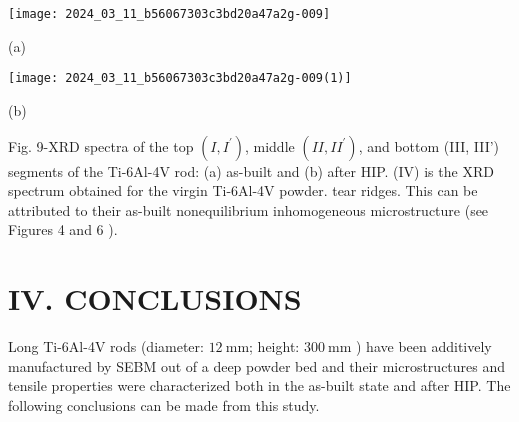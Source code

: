 \documentclass[10pt]{article}
\begin{document}
\begin{center}
\texttt{[image: 2024\_03\_11\_b56067303c3bd20a47a2g-009]}
\end{center}

(a)

\begin{center}
\texttt{[image: 2024\_03\_11\_b56067303c3bd20a47a2g-009(1)]}
\end{center}

(b)

Fig. 9-XRD spectra of the top $\left(I, I^{\prime}\right)$, middle $\left(I I, I I^{\prime}\right)$, and bottom (III, III') segments of the Ti-6Al-4V rod: (a) as-built and (b) after HIP. (IV) is the XRD spectrum obtained for the virgin Ti-6Al-4V powder. tear ridges. This can be attributed to their as-built nonequilibrium inhomogeneous microstructure (see Figures 4 and 6 ).

\section*{IV. CONCLUSIONS}
Long Ti-6Al-4V rods (diameter: $12 \mathrm{~mm}$; height: $300 \mathrm{~mm}$ ) have been additively manufactured by SEBM out of a deep powder bed and their microstructures and tensile properties were characterized both in the as-built state and after HIP. The following conclusions can be made from this study.
\end{document}
